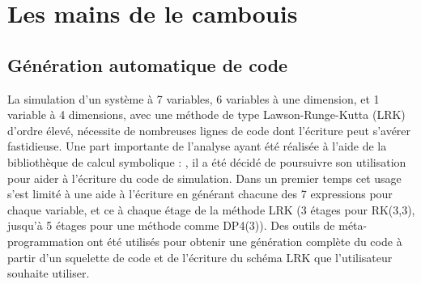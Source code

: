 
\section{Les mains de le cambouis}

\subsection{Génération automatique de code}
\label{ssec:3:codegen}


La simulation d'un système à 7 variables, 6 variables à une dimension, et 1 variable à 4 dimensions, avec une méthode de type Lawson-Runge-Kutta (LRK) d'ordre élevé, nécessite de nombreuses lignes de code dont l'écriture peut s'avérer fastidieuse. Une part importante de l'analyse ayant été réalisée à l'aide de la bibliothèque de calcul symbolique \Python{} : \sympy, il a été décidé de poursuivre son utilisation pour aider à l'écriture du code de simulation. Dans un premier temps cet usage s'est limité à une aide à l'écriture en générant chacune des 7 expressions pour chaque variable, et ce à chaque étage de la méthode LRK (3 étages pour RK(3,3), jusqu'à 5 étages pour une méthode comme DP4(3)). Des outils de méta-programmation ont été utilisés pour obtenir une génération complète du code à partir d'un squelette de code et de l'écriture du schéma LRK que l'utilisateur souhaite utiliser.

